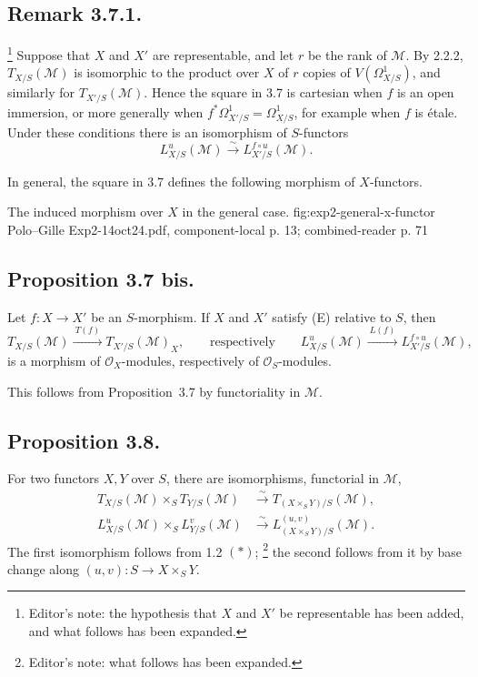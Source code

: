 \subsection*{Remark 3.7.1.}
\footnote{Editor's note: the hypothesis that \(X\) and \(X'\) be
representable has been added, and what follows has been expanded.}
Suppose that \(X\) and \(X'\) are representable, and let \(r\) be the rank
of \(\mathcal M\). By 2.2.2, \(T_{X/S}(\mathcal M)\) is isomorphic to the
product over \(X\) of \(r\) copies of \(V(\Omega^1_{X/S})\), and similarly
for \(T_{X'/S}(\mathcal M)\). Hence the square in 3.7 is cartesian when
\(f\) is an open immersion, or more generally when
\(f^*\Omega^1_{X'/S}=\Omega^1_{X/S}\), for example when \(f\) is
\'etale. Under these conditions there is an isomorphism of \(S\)-functors
\[
  L^u_{X/S}(\mathcal M)
  \xrightarrow{\sim}L^{f\circ u}_{X'/S}(\mathcal M).
\]

In general, the square in 3.7 defines the following morphism of
\(X\)-functors.

  {The induced morphism over \(X\) in the general case.}
  {fig:exp2-general-x-functor}
  {Polo--Gille Exp2-14oct24.pdf, component-local p. 13; combined-reader p. 71}

\subsection*{Proposition 3.7 bis.}
Let \(f:X\to X'\) be an \(S\)-morphism. If \(X\) and \(X'\) satisfy
(E) relative to \(S\), then
\[
  T_{X/S}(\mathcal M)\xrightarrow{\ T(f)\ }
  T_{X'/S}(\mathcal M)_X,
  \qquad\text{respectively}\qquad
  L^u_{X/S}(\mathcal M)\xrightarrow{\ L(f)\ }
  L^{f\circ u}_{X'/S}(\mathcal M),
\]
is a morphism of \(\mathcal O_X\)-modules, respectively of
\(\mathcal O_S\)-modules.

This follows from Proposition~3.7 by functoriality in \(\mathcal M\).

\subsection*{Proposition 3.8.}
For two functors \(X,Y\) over \(S\), there are isomorphisms, functorial in
\(\mathcal M\),
\begin{align}
  T_{X/S}(\mathcal M)\times_ST_{Y/S}(\mathcal M)
    &\xrightarrow{\sim}T_{(X\times_SY)/S}(\mathcal M), \tag{3.8.1}\\
  L^u_{X/S}(\mathcal M)\times_SL^v_{Y/S}(\mathcal M)
    &\xrightarrow{\sim}L^{(u,v)}_{(X\times_SY)/S}(\mathcal M). \tag{3.8.2}
\end{align}
The first isomorphism follows from 1.2 \((*)\);
\footnote{Editor's note: what follows has been expanded.}
the second follows from it
by base change along \((u,v):S\to X\times_SY\).


